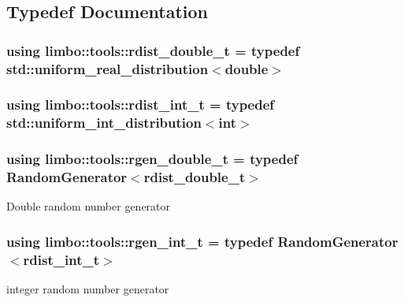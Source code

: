 \subsection{Typedef Documentation}
\hypertarget{group__tools_gab2609bfef1e3bdb8b44c0d6c8c139927}{}
\subsubsection[{rdist\+\_\+double\+\_\+t}]{\setlength{\rightskip}{0pt plus 5cm}using {\bf limbo\+::tools\+::rdist\+\_\+double\+\_\+t} = typedef std\+::uniform\+\_\+real\+\_\+distribution$<$double$>$}\label{group__tools_gab2609bfef1e3bdb8b44c0d6c8c139927}
\hypertarget{group__tools_gacb322b4600b2e500dbcd24661a749f49}{}
\subsubsection[{rdist\+\_\+int\+\_\+t}]{\setlength{\rightskip}{0pt plus 5cm}using {\bf limbo\+::tools\+::rdist\+\_\+int\+\_\+t} = typedef std\+::uniform\+\_\+int\+\_\+distribution$<$int$>$}\label{group__tools_gacb322b4600b2e500dbcd24661a749f49}
\hypertarget{group__tools_gacdb2963659056fc5fa9f94405f59a851}{}
\subsubsection[{rgen\+\_\+double\+\_\+t}]{\setlength{\rightskip}{0pt plus 5cm}using {\bf limbo\+::tools\+::rgen\+\_\+double\+\_\+t} = typedef Random\+Generator$<$rdist\+\_\+double\+\_\+t$>$}\label{group__tools_gacdb2963659056fc5fa9f94405f59a851}
Double random number generator \hypertarget{group__tools_ga3df78ebcb864be91e73e840bb42b9208}{}
\subsubsection[{rgen\+\_\+int\+\_\+t}]{\setlength{\rightskip}{0pt plus 5cm}using {\bf limbo\+::tools\+::rgen\+\_\+int\+\_\+t} = typedef Random\+Generator$<$rdist\+\_\+int\+\_\+t$>$}\label{group__tools_ga3df78ebcb864be91e73e840bb42b9208}
integer random number generator 

